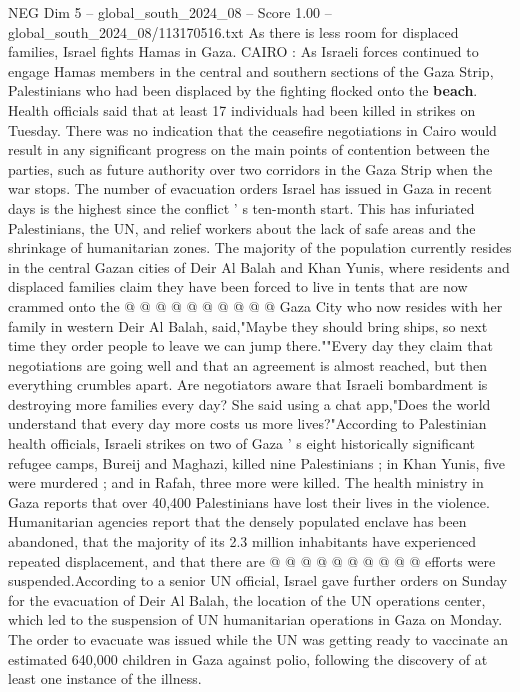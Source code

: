 \begin{textsample}{NEG Dim 5 – global\_south\_2024\_08 – Score 1.00 – global\_south\_2024\_08/113170516.txt}  \label{ex:f5_neg_179}
As there is less room for displaced families, Israel fights Hamas in Gaza.
CAIRO : As Israeli forces continued to engage Hamas members in the central and southern sections of the Gaza Strip, Palestinians who had been displaced by the fighting flocked onto the \textbf{beach}.
Health officials said that at least 17 individuals had been killed in strikes on Tuesday.
There was no indication that the ceasefire negotiations in Cairo would result in any significant progress on the main points of contention between the parties, such as future authority over two corridors in the Gaza Strip when the war stops.
The number of evacuation orders Israel has issued in Gaza in recent days is the highest since the conflict ' s ten-month start.
This has infuriated Palestinians, the UN, and relief workers about the lack of safe areas and the shrinkage of humanitarian zones.
The majority of the population currently resides in the central Gazan cities of Deir Al Balah and Khan Yunis, where residents and displaced families claim they have been forced to live in tents that are now crammed onto the @ @ @ @ @ @ @ @ @ @ Gaza City who now resides with her family in western Deir Al Balah, said,"Maybe they should bring ships, so next time they order people to leave we can jump there.""Every day they claim that negotiations are going well and that an agreement is almost reached, but then everything crumbles apart.
Are negotiators aware that Israeli bombardment is destroying more families every day?
She said using a chat app,"Does the world understand that every day more costs us more lives?"According to Palestinian health officials, Israeli strikes on two of Gaza ' s eight historically significant refugee camps, Bureij and Maghazi, killed nine Palestinians ; in Khan Yunis, five were murdered ; and in Rafah, three more were killed.
The health ministry in Gaza reports that over 40,400 Palestinians have lost their lives in the violence.
Humanitarian agencies report that the densely populated enclave has been abandoned, that the majority of its 2.3 million inhabitants have experienced repeated displacement, and that there are @ @ @ @ @ @ @ @ @ @ efforts were suspended.According to a senior UN official, Israel gave further orders on Sunday for the evacuation of Deir Al Balah, the location of the UN operations center, which led to the suspension of UN humanitarian operations in Gaza on Monday.
The order to evacuate was issued while the UN was getting ready to vaccinate an estimated 640,000 children in Gaza against polio, following the discovery of at least one instance of the illness.

\end{textsample}

